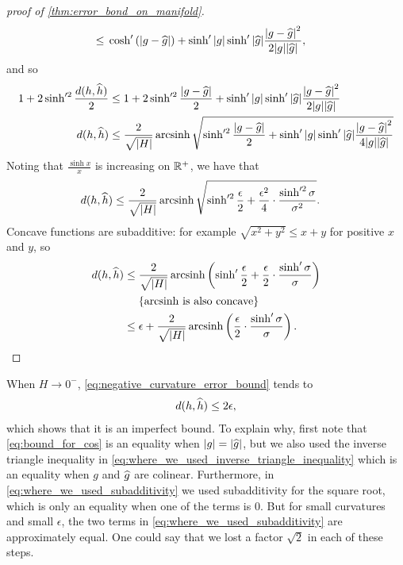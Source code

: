 \documentclass[english, a4paper, 12pt]{article}
\begin{document}
\begin{proof}[proof of \cref{thm:error_bond_on_manifold}]
\begin{align}
		\leq{}& \cosh'{(\abs{g - \mathhat{g}})} + \sinh'{\abs{g}} \sinh'{\abs{\mathhat{g}}} \frac{\abs{g - \mathhat{g}}^2}{2 \abs{g} \abs{\mathhat{g}}},%
		\label{eq:where_we_used_inverse_triangle_inequality}
	\end{align}
	and so
	\begin{align}
		1 + 2 \sinh'^2{\frac{d(h, \mathhat{h})}{2}} \leq{}& 1 + 2 \sinh'^2{\frac{\abs{g - \mathhat{g}}}{2}} + \sinh'{\abs{g}} \sinh'{\abs{\mathhat{g}}} \frac{\abs{g - \mathhat{g}}^2}{2 \abs{g} \abs{\mathhat{g}}}%
		\label{eq:where_we_used_cosh_double_angle_formula}\\
		d(h, \mathhat{h}) \leq{}& \frac{2}{\sqrt{\abs{H}}} \operatorname{arcsinh} \sqrt{
			\sinh'^2{\frac{\abs{g - \mathhat{g}}}{2}} + \sinh'{\abs{g}} \sinh'{\abs{\mathhat{g}}} \frac{\abs{g - \mathhat{g}}^2}{4 \abs{g} \abs{\mathhat{g}}}
			}%
	\end{align}
	Noting that $\frac{\sinh{x}}{x}$ is increasing on $\mathbb{R}^+$, we have that
	\begin{align}
		d(h, \widehat{h}) \leq{}& \frac{2}{\sqrt{\abs{H}}}  \operatorname{arcsinh} \sqrt{
			\sinh'^2{\frac{\epsilon}{2}} + \frac{\epsilon^2}{4} \cdot \frac{\sinh'^2{\sigma}}{\sigma^2}
			}.
	\end{align}
	Concave functions are subadditive: for example $\sqrt{x^2 + y^2} \leq x + y$ for positive $x$ and $y$, so
	\begin{align}
		d(h, \mathhat{h}) \leq{}& \frac{2}{\sqrt{\abs{H}}} \operatorname{arcsinh} \left(
			\sinh'{\frac{\epsilon}{2}} + \frac{\epsilon}{2} \cdot \frac{\sinh'{\sigma}}{\sigma}
			\right)%
		\label{eq:where_we_used_subadditivity}\\
		&\{\text{$\operatorname{arcsinh}$ is also concave}\}\\
		\leq{}& \epsilon + \frac{2}{\sqrt{\abs{H}}} \operatorname{arcsinh} \left(
			\frac{\epsilon}{2} \cdot \frac{\sinh'{\sigma}}{\sigma}
			\right).%
		\label{eq:end_of_proof}
	\end{align}
\end{proof}

When $H \to 0^-$, \cref{eq:negative_curvature_error_bound} tends to
\begin{align}
	d(h, \widehat{h}) \leq 2 \epsilon,
\end{align}
which shows that it is an imperfect bound.
To explain why, first note that \cref{eq:bound_for_cos} is an equality when $\abs{g} = \abs{\widehat{g}}$, but we also used the inverse triangle inequality in \cref{eq:where_we_used_inverse_triangle_inequality} which is an equality when $g$ and $\widehat{g}$ are colinear.
Furthermore, in \cref{eq:where_we_used_subadditivity} we used subadditivity for the square root, which is only an equality when one of the terms is $0$.
But for small curvatures and small $\epsilon$, the two terms in \cref{eq:where_we_used_subadditivity} are approximately equal.
One could say that we lost a factor $\sqrt{2}$ in each of these steps.
\end{document}
